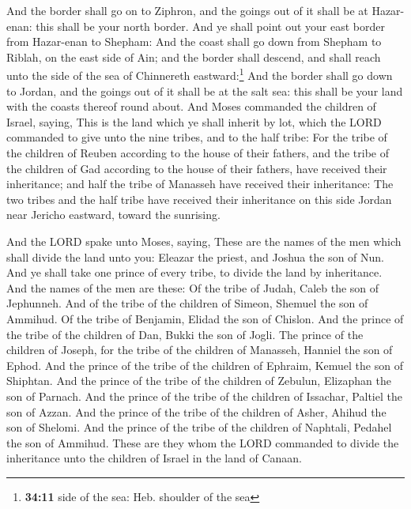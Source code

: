  And the border shall go on to Ziphron, and the goings out
of it shall be at Hazar-enan: this shall be your north border.
 And ye shall point out your east border from Hazar-enan
to Shepham:  And the coast shall go down from Shepham to
Riblah, on the east side of Ain; and the border shall descend, and shall
reach unto the side of the sea of Chinnereth eastward:\footnote{\textbf{34:11}
  side of the sea: Heb. shoulder of the sea}  And the
border shall go down to Jordan, and the goings out of it shall be at the
salt sea: this shall be your land with the coasts thereof round about.
 And Moses commanded the children of Israel, saying, This
is the land which ye shall inherit by lot, which the LORD commanded to
give unto the nine tribes, and to the half tribe:  For
the tribe of the children of Reuben according to the house of their
fathers, and the tribe of the children of Gad according to the house of
their fathers, have received their inheritance; and half the tribe of
Manasseh have received their inheritance:  The two tribes
and the half tribe have received their inheritance on this side Jordan
near Jericho eastward, toward the sunrising.

 And the LORD spake unto Moses, saying, 
These are the names of the men which shall divide the land unto you:
Eleazar the priest, and Joshua the son of Nun.  And ye
shall take one prince of every tribe, to divide the land by inheritance.
 And the names of the men are these: Of the tribe of
Judah, Caleb the son of Jephunneh.  And of the tribe of
the children of Simeon, Shemuel the son of Ammihud.  Of
the tribe of Benjamin, Elidad the son of Chislon.  And
the prince of the tribe of the children of Dan, Bukki the son of Jogli.
 The prince of the children of Joseph, for the tribe of
the children of Manasseh, Hanniel the son of Ephod.  And
the prince of the tribe of the children of Ephraim, Kemuel the son of
Shiphtan.  And the prince of the tribe of the children of
Zebulun, Elizaphan the son of Parnach.  And the prince of
the tribe of the children of Issachar, Paltiel the son of Azzan.
 And the prince of the tribe of the children of Asher,
Ahihud the son of Shelomi.  And the prince of the tribe
of the children of Naphtali, Pedahel the son of Ammihud. 
These are they whom the LORD commanded to divide the inheritance unto
the children of Israel in the land of Canaan.

